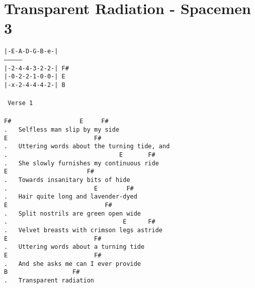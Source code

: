 \newpage
\section{Transparent Radiation - Spacemen 3}
\label{Transparent Radiation - Spacemen 3}
\texttt{|-E-A-D-G-B-e-|\\
---------------\\
|-2-4-4-3-2-2-|\ F\#\\
|-0-2-2-1-0-0-|\ E\\
|-x-2-4-4-4-2-|\ B\\
\\
\lbrack\ Verse\ 1\rbrack\\
\\
F\#\ \ \ \ \ \ \ \ \ \ \ \ \ \ \ \ \ \ \ E\ \ \ \ \ F\#\\
. \ \ Selfless\ man\ slip\ by\ my\ side\\
E\ \ \ \ \ \ \ \ \ \ \ \ \ \ \ \ \ \ \ \ \ \ \ \ F\#\ \\
. \ \ Uttering\ words\ about\ the\ turning\ tide,\ and\\
. \ \ \ \ \ \ \ \ \ \ \ \ \ \ \ \ \ \ \ \ \ \ \ \ \ \ \ \ \ \ E\ \ \ \ \ \ \ F\#\\
. \ \ She\ slowly\ furnishes\ my\ continuous\ ride\\
E\ \ \ \ \ \ \ \ \ \ \ \ \ \ \ \ \ \ \ \ \ \ F\#\ \ \\
. \ \ Towards\ insanitary\ bits\ of\ hide\\
. \ \ \ \ \ \ \ \ \ \ \ \ \ \ \ \ \ \ \ \ \ \ \ E\ \ \ \ \ \ \ \ F\#\\
. \ \ Hair\ quite\ long\ and\ lavender-dyed\\
E\ \ \ \ \ \ \ \ \ \ \ \ \ \ \ \ \ \ \ \ \ \ \ \ \ \ \ F\#\ \ \\
. \ \ Split\ nostrils\ are\ green\ open\ wide\\
. \ \ \ \ \ \ \ \ \ \ \ \ \ \ \ \ \ \ \ \ \ \ \ \ \ \ \ \ \ \ \ E\ \ \ \ \ \ F\#\\
. \ \ Velvet\ breasts\ with\ crimson\ legs\ astride\\
E\ \ \ \ \ \ \ \ \ \ \ \ \ \ \ \ \ \ \ \ \ \ \ \ F\#\\
. \ \ Uttering\ words\ about\ a\ turning\ tide\\
E\ \ \ \ \ \ \ \ \ \ \ \ \ \ \ \ \ \ \ \ \ \ \ \ F\#\\
. \ \ And\ she\ asks\ me\ can\ I\ ever\ provide\\
B\ \ \ \ \ \ \ \ \ \ \ \ \ \ \ \ \ \ F\#\ \\
. \ \ Transparent\ radiation\\
}
